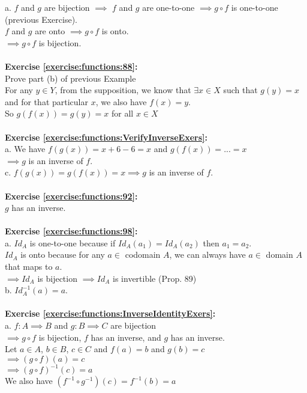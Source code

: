 a. $f$ and $g$ are bijection $\implies$  $f$ and $g$ are one-to-one $\implies g\circ f$ is one-to-one (previous Exercise).\\
$f$ and $g$ are onto $\implies g\circ f$ is onto.\\
$\implies g\circ f$ is bijection.\\
\\
\textbf{Exercise \ref{exercise:functions:88}:}\\
Prove part (b) of previous Example\\
For any $y\in Y$, from the supposition, we know that $\exists x\in X$ such that $g(y)=x$ and for that particular $x$, we also have $f(x)=y$.\\
So $g(f(x))=g(y)=x$ for all $x\in X$\\
\\
\textbf{Exercise \ref{exercise:functions:VerifyInverseExers}:}\\
a. We have $f(g(x))=x+6-6=x$ and $g(f(x))=...=x$\\
$\implies g$ is an inverse of $f$.\\
c. $f(g(x))=g(f(x))=x \implies g$ is an inverse of $f$.\\
\\
\textbf{Exercise \ref{exercise:functions:92}:}\\
$g$ has an inverse.\\
\\
\textbf{Exercise \ref{exercise:functions:98}:}\\
a. $Id_A$ is one-to-one because if $Id_A(a_1)=Id_A(a_2)$ then $a_1=a_2$.\\
$Id_A$ is onto because for any $a\in$ codomain $A$, we can always have $a\in$ domain $A$ that maps to $a$.\\
$\implies Id_A$ is bijection $\implies Id_A$ is invertible (Prop. 89)\\
b. $Id_A^{-1}(a)=a$.\\
\\
\textbf{Exercise \ref{exercise:functions:InverseIdentityExers}:}\\
a. $f: A\implies B$ and $g: B\implies C$ are bijection\\
$\implies g\circ f$ is bijection, $f$ has an inverse, and $g$ has an inverse.\\
Let $a\in A$, $b\in B$, $c\in C$ and $f(a)=b$ and $g(b)=c$\\
$\implies (g\circ f)(a)=c$\\
$\implies (g\circ f)^{-1}(c)=a$\\
We also have $(f^{-1}\circ g^{-1})(c)=f^{-1}(b)=a$\\
